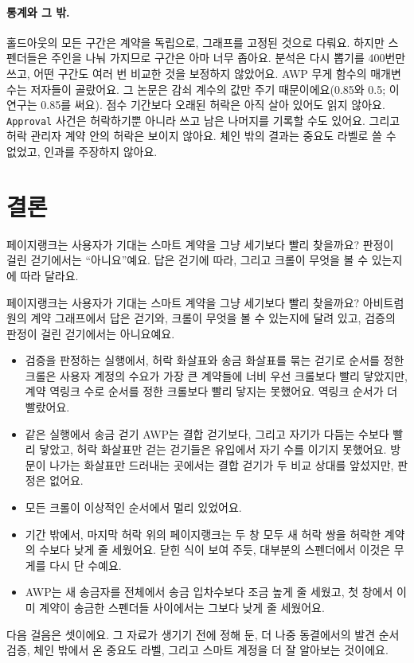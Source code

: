 \paragraph{통계와 그 밖.}
홀드아웃의 모든 구간은 계약을 독립으로, 그래프를 고정된 것으로 다뤄요. 하지만 스펜더들은 주인을 나눠 가지므로 구간은 아마 너무 좁아요. 분석은 다시 뽑기를 400번만 쓰고, 어떤 구간도 여러 번 비교한 것을 보정하지 않았어요. AWP 무게 함수의 매개변수는 저자들이 골랐어요. 그 논문은 감쇠 계수의 값만 주기 때문이에요(0.85와 0.5; 이 연구는 0.85를 써요). 점수 기간보다 오래된 허락은 아직 살아 있어도 읽지 않아요. \texttt{Approval} 사건은 허락하기뿐 아니라 쓰고 남은 나머지를 기록할 수도 있어요. 그리고 허락 관리자 계약 안의 허락은 보이지 않아요. 체인 밖의 결과는 중요도 라벨로 쓸 수 없었고, 인과를 주장하지 않아요.

\section{결론}

\begin{yoji}
페이지랭크는 사용자가 기대는 스마트 계약을 그냥 세기보다 빨리 찾을까요? 판정이 걸린 걷기에서는 “아니요”예요. 답은 걷기에 따라, 그리고 크롤이 무엇을 볼 수 있는지에 따라 달라요.
\end{yoji}

페이지랭크는 사용자가 기대는 스마트 계약을 그냥 세기보다 빨리 찾을까요? 아비트럼 원의 계약 그래프에서 답은 걷기와, 크롤이 무엇을 볼 수 있는지에 달려 있고, 검증의 판정이 걸린 걷기에서는 아니요예요.
\begin{itemize}
\item 검증을 판정하는 실행에서, 허락 화살표와 송금 화살표를 묶는 걷기로 순서를 정한 크롤은 사용자 계정의 수요가 가장 큰 계약들에 너비 우선 크롤보다 빨리 닿았지만, 계약 역링크 수로 순서를 정한 크롤보다 빨리 닿지는 못했어요. 역링크 순서가 더 빨랐어요.
\item 같은 실행에서 송금 걷기 AWP는 결합 걷기보다, 그리고 자기가 다듬는 수보다 빨리 닿았고, 허락 화살표만 걷는 걷기들은 유입에서 자기 수를 이기지 못했어요. 방문이 나가는 화살표만 드러내는 곳에서는 결합 걷기가 두 비교 상대를 앞섰지만, 판정은 없어요.
\item 모든 크롤이 이상적인 순서에서 멀리 있었어요.
\item 기간 밖에서, 마지막 허락 위의 페이지랭크는 두 창 모두 새 허락 쌍을 허락한 계약의 수보다 낮게 줄 세웠어요. 닫힌 식이 보여 주듯, 대부분의 스펜더에서 이것은 무게를 다시 단 수예요.
\item AWP는 새 송금자를 전체에서 송금 입차수보다 조금 높게 줄 세웠고, 첫 창에서 이미 계약이 송금한 스펜더들 사이에서는 그보다 낮게 줄 세웠어요.
\end{itemize}
다음 걸음은 셋이에요. 그 자료가 생기기 전에 정해 둔, 더 나중 동결에서의 발견 순서 검증, 체인 밖에서 온 중요도 라벨, 그리고 스마트 계정을 더 잘 알아보는 것이에요.
